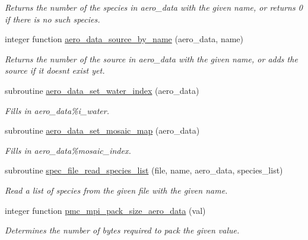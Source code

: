 \begin{DoxyCompactItemize}
\begin{DoxyCompactList}\small\item\em Returns the number of the species in aero\+\_\+data with the given name, or returns 0 if there is no such species. \end{DoxyCompactList}\item 
integer function \mbox{\hyperlink{namespacepmc__aero__data_a4c9973271c8247581ab4e34fa0c6f0f6}{aero\+\_\+data\+\_\+source\+\_\+by\+\_\+name}} (aero\+\_\+data, name)
\begin{DoxyCompactList}\small\item\em Returns the number of the source in aero\+\_\+data with the given name, or adds the source if it doesn\textquotesingle{}t exist yet. \end{DoxyCompactList}\item 
subroutine \mbox{\hyperlink{namespacepmc__aero__data_afac9815605157d507b8e708731c973c4}{aero\+\_\+data\+\_\+set\+\_\+water\+\_\+index}} (aero\+\_\+data)
\begin{DoxyCompactList}\small\item\em Fills in aero\+\_\+data\%i\+\_\+water. \end{DoxyCompactList}\item 
subroutine \mbox{\hyperlink{namespacepmc__aero__data_a3913fb7b68923205dca2ec44b997505a}{aero\+\_\+data\+\_\+set\+\_\+mosaic\+\_\+map}} (aero\+\_\+data)
\begin{DoxyCompactList}\small\item\em Fills in aero\+\_\+data\%mosaic\+\_\+index. \end{DoxyCompactList}\item 
subroutine \mbox{\hyperlink{namespacepmc__aero__data_a106682c46afe4a0f960a9535250b58cc}{spec\+\_\+file\+\_\+read\+\_\+species\+\_\+list}} (file, name, aero\+\_\+data, species\+\_\+list)
\begin{DoxyCompactList}\small\item\em Read a list of species from the given file with the given name. \end{DoxyCompactList}\item 
integer function \mbox{\hyperlink{namespacepmc__aero__data_a0183904fc27e055d97fad1537c371c5d}{pmc\+\_\+mpi\+\_\+pack\+\_\+size\+\_\+aero\+\_\+data}} (val)
\begin{DoxyCompactList}\small\item\em Determines the number of bytes required to pack the given value. \end{DoxyCompactList}\item 

\end{DoxyCompactItemize}
